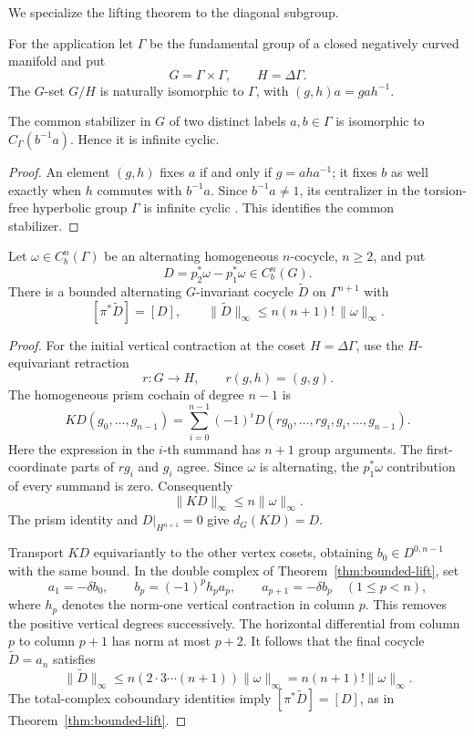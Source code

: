 We specialize the lifting theorem to the diagonal subgroup.

For the application let $\Gamma$ be the fundamental group
of a closed negatively curved manifold and put
\[
 G=\Gamma\times\Gamma,\qquad H=\Delta\Gamma.
\]
The $G$-set $G/H$ is naturally isomorphic to $\Gamma$,
with $(g,h)a=gah^{-1}$.

\begin{lemma}\label{lem:diagonal-stabilizers}
The common stabilizer in $G$ of two distinct labels
$a,b\in\Gamma$ is isomorphic to
$C_\Gamma(b^{-1}a)$. Hence it is infinite cyclic.
\end{lemma}

\begin{proof}
An element $(g,h)$ fixes $a$ if and only if
$g=aha^{-1}$; it fixes $b$ as well exactly when
$h$ commutes with $b^{-1}a$.
Since $b^{-1}a\ne1$, its centralizer in the
torsion-free hyperbolic group $\Gamma$ is
infinite cyclic \cite{BridsonHaefliger1999}. This identifies the
common stabilizer.
\end{proof}

\begin{proposition}\label{prop:difference-lift-bound}
Let $\omega\in C_b^n(\Gamma)$ be an alternating homogeneous
$n$-cocycle, $n\geq2$, and put
\[
 D=p_2^*\omega-p_1^*\omega\in C_b^n(G).
\]
There is a bounded alternating $G$-invariant cocycle
$\widetilde D$ on $\Gamma^{n+1}$ with
\[
 [\pi^*\widetilde D]=[D],\qquad
 \|\widetilde D\|_\infty
 \leq n(n+1)!\,\|\omega\|_\infty.
\]
\end{proposition}

\begin{proof}
For the initial vertical contraction at the coset
$H=\Delta\Gamma$, use the $H$-equivariant retraction
\[
 r:G\longrightarrow H,\qquad r(g,h)=(g,g).
\]
The homogeneous prism cochain of degree $n-1$ is
\[
 KD(g_0,\ldots,g_{n-1})
 =\sum_{i=0}^{n-1}(-1)^i
 D(rg_0,\ldots,rg_i,g_i,\ldots,g_{n-1}).
\]
Here the expression in the $i$-th summand has
$n+1$ group arguments. The first-coordinate
parts of $rg_i$ and $g_i$ agree. Since $\omega$
is alternating, the $p_1^*\omega$ contribution
of every summand is zero. Consequently
\[
 \|KD\|_\infty\leq n\|\omega\|_\infty.
\]
The prism identity and $D|_{H^{n+1}}=0$
give $d_G(KD)=D$.

Transport $KD$ equivariantly to the other vertex
cosets, obtaining $b_0\in D^{0,n-1}$
with the same bound. In the double complex
of Theorem~\ref{thm:bounded-lift}, set
\[
 a_1=-\delta b_0,\qquad
 b_p=(-1)^p h_pa_p,\qquad
 a_{p+1}=-\delta b_p
 \quad(1\leq p<n),
\]
where $h_p$ denotes the norm-one vertical
contraction in column $p$. This removes the
positive vertical degrees successively.
The horizontal differential from column
$p$ to column $p+1$ has norm at most $p+2$.
It follows that the final cocycle
$\widetilde D=a_n$ satisfies
\[
 \|\widetilde D\|_\infty
 \leq n(2\cdot3\cdots(n+1))
       \|\omega\|_\infty
 =n(n+1)!\|\omega\|_\infty.
\]
The total-complex coboundary identities imply
$[\pi^*\widetilde D]=[D]$, as in
Theorem~\ref{thm:bounded-lift}.
\end{proof}


